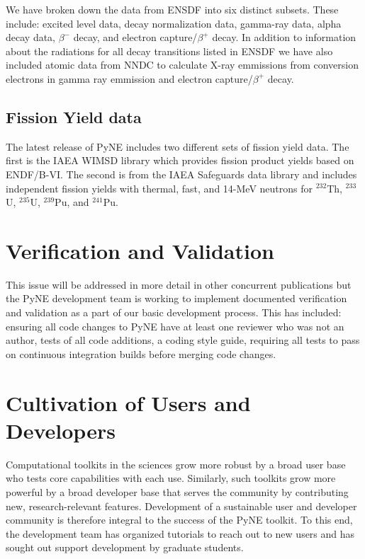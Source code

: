 \documentclass{anstrans}
\begin{document}
We have broken down the data from ENSDF into six distinct subsets. These include: excited level data, decay normalization data, gamma-ray data, alpha decay data, $\beta^-$ decay, and electron capture/$\beta^+$ decay. In addition to information about the radiations for all decay transitions listed in ENSDF we have also included atomic data from NNDC to calculate X-ray emmissions from conversion electrons in gamma ray emmission and electron capture/$\beta^+$ decay.

\subsection{Fission Yield data}

The latest release of PyNE includes two different sets of fission yield data. The first is the IAEA WIMSD library which provides fission product yields based on ENDF/B-VI. The second is from the IAEA Safeguards data library and includes independent fission yields with thermal, fast, and 14-MeV neutrons for $^{232}$Th, $^{233}$U, $^{235}$U, $^{239}$Pu, and $^{241}$Pu.

\section{Verification and Validation}

This issue will be addressed in more detail in other concurrent publications but the PyNE development team is working to implement documented verification and validation as a part of our basic development process. This has included: ensuring all code changes to PyNE have at least one reviewer who was not an author, tests of all code additions, a coding style guide, requiring all tests to pass on continuous integration builds before merging code changes. 

\section{Cultivation of Users and Developers} 
Computational toolkits in the sciences grow more robust by a broad user base who tests core capabilities with each use. Similarly, such toolkits grow more powerful by a broad developer base that serves the community by contributing new, research-relevant features. Development of a sustainable user and developer community is therefore integral to the success of the PyNE toolkit. To this end, the development team has organized tutorials to reach out to new users and has sought out support development by graduate students.
\end{document}
